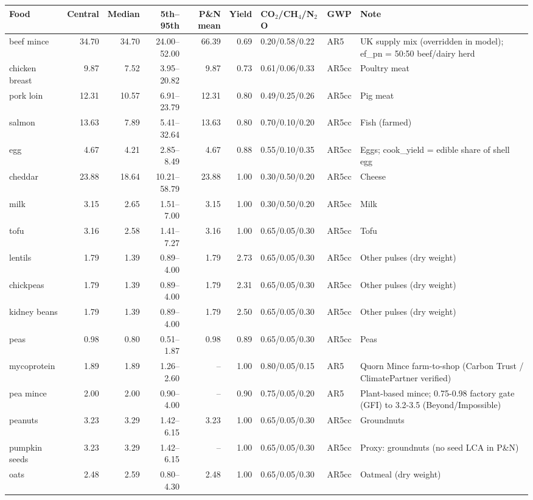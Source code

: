 \begin{tabular}{lrrrrrlll}
\toprule
Food & Central & Median & 5th--95th & P\&N mean & Yield & CO$_2$/CH$_4$/N$_2$O & GWP & Note \\
\midrule
beef mince & 34.70 & 34.70 & 24.00--52.00 & 66.39 & 0.69 & 0.20/0.58/0.22 & AR5 & UK supply mix (overridden in model); ef\_pn = 50:50 beef/dairy herd \\
chicken breast & 9.87 & 7.52 & 3.95--20.82 & 9.87 & 0.73 & 0.61/0.06/0.33 & AR5cc & Poultry meat \\
pork loin & 12.31 & 10.57 & 6.91--23.79 & 12.31 & 0.80 & 0.49/0.25/0.26 & AR5cc & Pig meat \\
salmon & 13.63 & 7.89 & 5.41--32.64 & 13.63 & 0.80 & 0.70/0.10/0.20 & AR5cc & Fish (farmed) \\
egg & 4.67 & 4.21 & 2.85--8.49 & 4.67 & 0.88 & 0.55/0.10/0.35 & AR5cc & Eggs; cook\_yield = edible share of shell egg \\
cheddar & 23.88 & 18.64 & 10.21--58.79 & 23.88 & 1.00 & 0.30/0.50/0.20 & AR5cc & Cheese \\
milk & 3.15 & 2.65 & 1.51--7.00 & 3.15 & 1.00 & 0.30/0.50/0.20 & AR5cc & Milk \\
tofu & 3.16 & 2.58 & 1.41--7.27 & 3.16 & 1.00 & 0.65/0.05/0.30 & AR5cc & Tofu \\
lentils & 1.79 & 1.39 & 0.89--4.00 & 1.79 & 2.73 & 0.65/0.05/0.30 & AR5cc & Other pulses (dry weight) \\
chickpeas & 1.79 & 1.39 & 0.89--4.00 & 1.79 & 2.31 & 0.65/0.05/0.30 & AR5cc & Other pulses (dry weight) \\
kidney beans & 1.79 & 1.39 & 0.89--4.00 & 1.79 & 2.50 & 0.65/0.05/0.30 & AR5cc & Other pulses (dry weight) \\
peas & 0.98 & 0.80 & 0.51--1.87 & 0.98 & 0.89 & 0.65/0.05/0.30 & AR5cc & Peas \\
mycoprotein & 1.89 & 1.89 & 1.26--2.60 & -- & 1.00 & 0.80/0.05/0.15 & AR5 & Quorn Mince farm-to-shop (Carbon Trust / ClimatePartner verified) \\
pea mince & 2.00 & 2.00 & 0.90--4.00 & -- & 0.90 & 0.75/0.05/0.20 & AR5 & Plant-based mince; 0.75-0.98 factory gate (GFI) to 3.2-3.5 (Beyond/Impossible) \\
peanuts & 3.23 & 3.29 & 1.42--6.15 & 3.23 & 1.00 & 0.65/0.05/0.30 & AR5cc & Groundnuts \\
pumpkin seeds & 3.23 & 3.29 & 1.42--6.15 & -- & 1.00 & 0.65/0.05/0.30 & AR5cc & Proxy: groundnuts (no seed LCA in P\&N) \\
oats & 2.48 & 2.59 & 0.80--4.30 & 2.48 & 1.00 & 0.65/0.05/0.30 & AR5cc & Oatmeal (dry weight) \\

\end{tabular}
